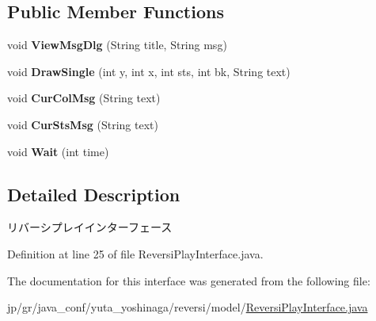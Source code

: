 \subsection*{Public Member Functions}
\begin{DoxyCompactItemize}
\item 
\mbox{\label{interfacejp_1_1gr_1_1java__conf_1_1yuta__yoshinaga_1_1reversi_1_1model_1_1_reversi_play_interface_ad18d82b1ba87e80bdb9191275297a7ee}} 
void {\bfseries View\+Msg\+Dlg} (String title, String msg)
\item 
\mbox{\label{interfacejp_1_1gr_1_1java__conf_1_1yuta__yoshinaga_1_1reversi_1_1model_1_1_reversi_play_interface_a3afe46bfc7c4d213f4ff337b59b412bb}} 
void {\bfseries Draw\+Single} (int y, int x, int sts, int bk, String text)
\item 
\mbox{\label{interfacejp_1_1gr_1_1java__conf_1_1yuta__yoshinaga_1_1reversi_1_1model_1_1_reversi_play_interface_a6e77a6933a85c2f7d5e1983ae705d33e}} 
void {\bfseries Cur\+Col\+Msg} (String text)
\item 
\mbox{\label{interfacejp_1_1gr_1_1java__conf_1_1yuta__yoshinaga_1_1reversi_1_1model_1_1_reversi_play_interface_ae4e363228aa513b929d592af1c63d774}} 
void {\bfseries Cur\+Sts\+Msg} (String text)
\item 
\mbox{\label{interfacejp_1_1gr_1_1java__conf_1_1yuta__yoshinaga_1_1reversi_1_1model_1_1_reversi_play_interface_a0af39ae1588a84c9caca420a00d88beb}} 
void {\bfseries Wait} (int time)
\end{DoxyCompactItemize}


\subsection{Detailed Description}
リバーシプレイインターフェース 

Definition at line 25 of file Reversi\+Play\+Interface.\+java.



The documentation for this interface was generated from the following file\+:\begin{DoxyCompactItemize}
\item 
jp/gr/java\+\_\+conf/yuta\+\_\+yoshinaga/reversi/model/\mbox{\hyperlink{_reversi_play_interface_8java}{Reversi\+Play\+Interface.\+java}}\end{DoxyCompactItemize}
